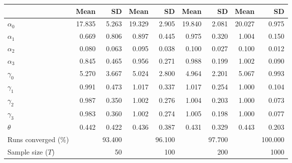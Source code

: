 
\begin{tabular}[t]{lrrrrrrrr}
\toprule
  & Mean & SD & Mean  & SD  & Mean   & SD   & Mean    & SD   \\
\midrule
$\alpha_{0}$ & 17.835 & 5.263 & 19.329 & 2.905 & 19.840 & 2.081 & 20.027 & 0.975\\
$\alpha_{1}$ & 0.669 & 0.806 & 0.897 & 0.445 & 0.975 & 0.320 & 1.004 & 0.150\\
$\alpha_{2}$ & 0.080 & 0.063 & 0.095 & 0.038 & 0.100 & 0.027 & 0.100 & 0.012\\
$\alpha_{3}$ & 0.845 & 0.465 & 0.956 & 0.271 & 0.988 & 0.199 & 1.002 & 0.090\\
$\gamma_{0}$ & 5.270 & 3.667 & 5.024 & 2.800 & 4.964 & 2.201 & 5.067 & 0.993\\
$\gamma_{1}$ & 0.991 & 0.473 & 1.017 & 0.337 & 1.017 & 0.254 & 1.000 & 0.104\\
$\gamma_{2}$ & 0.987 & 0.350 & 1.002 & 0.276 & 1.004 & 0.203 & 1.000 & 0.073\\
$\gamma_{3}$ & 0.983 & 0.360 & 1.002 & 0.274 & 1.005 & 0.198 & 1.000 & 0.077\\
$\theta$ & 0.442 & 0.422 & 0.436 & 0.387 & 0.431 & 0.329 & 0.443 & 0.203\\
Runs converged (\%) &  & 93.400 &  & 96.100 &  & 97.700 &  & 100.000\\
Sample size ($T$) &  & 50 &  & 100 &  & 200 &  & 1000\\
\bottomrule
\end{tabular}
